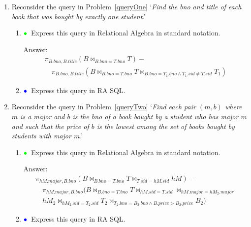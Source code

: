 \documentclass[11pt]{article}
\newcommand{\green}[1]{{\color{green}#1}}
\newcommand{\blue}[1]{{\color{blue}#1}}
\newcommand{\greenbullet}{$\green{\bullet}$}
\newcommand{\bluebullet}{$\blue{\bullet}$}
\begin{document}
\begin{enumerate}[resume]
\item Reconsider the query in Problem~\ref{queryOne}
`\emph{Find the bno and title of each book that
was bought by exactly one student}.' 
     \begin{enumerate}
    
     \item  \greenbullet\  Express this query in Relational Algebra in standard notation.
     
     Answer:
     {
     \[
  \begin{array}{l}
\pi_{B.bno,B.title}(B \bowtie_{B.bno=T.bno}T) - \\ \quad
  \pi_{B.bno,B.title}(B\bowtie_{B.bno=T.bno}T\bowtie_{B.bno=T_{1}.bno \land T_{1}.sid \neq T.sid}T_{1})
  \end{array}
\]
}
    


     \item  \bluebullet\ Express this query in RA SQL.
     \end{enumerate}

\newpage

\item Reconsider the query in Problem~\ref{queryTwo}
`\emph{Find each pair $(m, b)$ where $m$ is a major and $b$ is the bno of a book bought by a student who has major $m$ and such that the price of $b$ is the lowest among the set of books bought by students with major $m$}.'
     \begin{enumerate}
    
     \item  \greenbullet\  Express this query in Relational Algebra in standard notation.
     
     Answer:
     {
     \[
  \begin{array}{l}
  \pi_{hM.major,B.bno}(B\bowtie_{B.bno=T.bno}T\bowtie_{T.sid=hM.sid}hM) - \\
  \quad \pi_{hM.major,B.bno}(B\bowtie_{B.bno=T.bno}T\bowtie_{hM.sid=T.sid}\bowtie_{hM.major=hM_{2}.major}\\ \quad hM_{2}\bowtie_{hM_{2}.sid=T_{2}.sid}T_{2}\bowtie_{T_{2}.bno=B_{2}.bno \land B.price > B_{2}.price} B_{2})
  \end{array}
\]
}
    
     \item  \bluebullet\  Express this query in RA SQL.
     

     \end{enumerate}


\end{enumerate}
\end{document}
